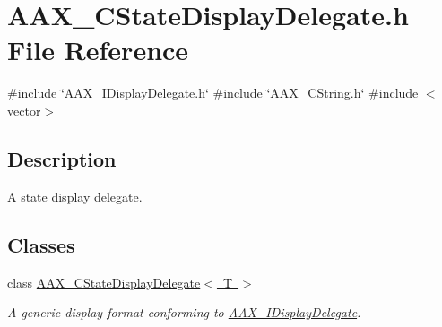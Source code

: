 \hypertarget{a00470}{}\section{A\+A\+X\+\_\+\+C\+State\+Display\+Delegate.\+h File Reference}
\label{a00470}
{\ttfamily \#include \char`\"{}A\+A\+X\+\_\+\+I\+Display\+Delegate.\+h\char`\"{}}\newline
{\ttfamily \#include \char`\"{}A\+A\+X\+\_\+\+C\+String.\+h\char`\"{}}\newline
{\ttfamily \#include $<$vector$>$}\newline


\subsection{Description}
A state display delegate. 

\subsection*{Classes}
\begin{DoxyCompactItemize}
\item 
class \mbox{\hyperlink{a01561}{A\+A\+X\+\_\+\+C\+State\+Display\+Delegate$<$ T $>$}}
\begin{DoxyCompactList}\small\item\em A generic display format conforming to \mbox{\hyperlink{a01801}{A\+A\+X\+\_\+\+I\+Display\+Delegate}}. \end{DoxyCompactList}\end{DoxyCompactItemize}
